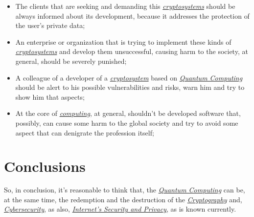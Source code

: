 \documentclass[conference]{IEEEtran}
\begin{document}
\begin{itemize}
    \item The clients that are seeking and demanding this \href{https://en.wikipedia.org/wiki/Cryptosystem}{\textit{cryptosystems}} should be always informed about its development, because it addresses the protection of the user's private data;
    \item An enterprise or organization that is trying to implement these kinds of \href{https://en.wikipedia.org/wiki/Cryptosystem}{\textit{cryptosystems}} and develop them unsuccessful, causing harm to the society, at general, should be severely punished;
    \item A colleague of a developer of a \href{https://en.wikipedia.org/wiki/Cryptosystem}{\textit{cryptosystem}} based on \href{https://en.wikipedia.org/wiki/Quantum_computing}{\textit{Quantum Computing}} should be alert to his possible vulnerabilities and risks, warn him and try to show him that aspects;
    \item At the core of \href{https://en.wikipedia.org/wiki/Computing}{\textit{computing}}, at general, shouldn't be developed software that, possibly, can cause some harm to the global society and try to avoid some aspect that can denigrate the profession itself;
\end{itemize}

\section*{Conclusions}

So, in conclusion, it's reasonable to think that, the \href{https://en.wikipedia.org/wiki/Quantum_computing}{\textit{Quantum Computing}} can be, at the same time, the redemption and the destruction of the \href{https://en.wikipedia.org/wiki/Cryptography}{\textit{Cryptography}} and, \href{https://en.wikipedia.org/wiki/Computer_security}{\textit{Cybersecurity}}, as also, \href{https://en.wikipedia.org/wiki/Computer_security}{\textit{Internet's Security and Privacy}}, as is known currently.

\vspace{6pt}
\end{document}
